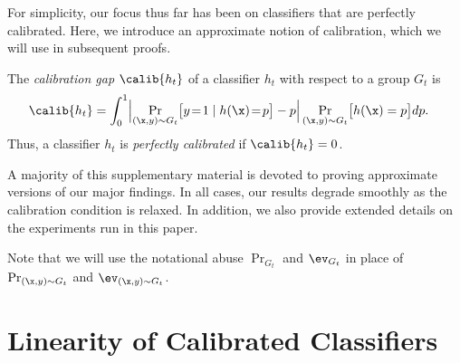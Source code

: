 For simplicity, our focus thus far has been on classifiers that are perfectly
calibrated. Here, we introduce an approximate notion of calibration, which we
will use in subsequent proofs.
%
\begin{definition}
  \label{def:calibration}
  The \emph{calibration gap} $\calib{h_t}$ of a classifier $h_t$
  with respect to a group $G_t$ is
  \begin{align}
    \calib{h_t}
    &= \int_{0}^{1} \Bigl\lvert \Pr_{(\x, y) \sim G_t} \bigl[ y\!=\!1 \mid h(\x)\!=\!p
  \bigr] - p \Bigr\rvert \Pr_{(\x, y) \sim G_t} \bigl[ h(\x) = p \bigr] dp.
      \label{eqn:approx-cal}
  \end{align}
  Thus, a classifier $h_t$ is \emph{perfectly calibrated} if $\calib{h_t} = 0$.
\end{definition}
%
A majority of this supplementary material is devoted to proving approximate
versions of our major findings. In all cases, our results degrade smoothly as
the calibration condition is relaxed.
In addition, we also provide extended details on the experiments run in this paper.

Note that we will use the notational abuse
$\Pr_{G_t}$ and $\ev_{G_t}$ in place of $\Pr_{(\x, y) \sim G_t}$
and $\ev_{(\x, y) \sim G_t}$.

\section{Linearity of Calibrated Classifiers}
\label{app:linearity}

